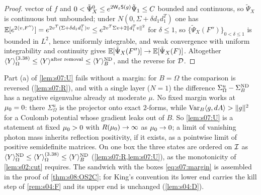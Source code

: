 \begin{proof}
vector of $f$ and $0<\tilde\Psi^0_X\le e^{2\mathsf W_{\varepsilon}\mathsf S(g)}\tilde\Psi_1\le C$ bounded and continuous, so $\tilde\Psi_X$ is continuous but unbounded; under $N(0,\Sigma+\delta d_1d_1^T)$ one has $\mathbb E[e^{2\langle v,F''\rangle}]=e^{2v^T(\Sigma+\delta d_1d_1^T)v}\le e^{2v^T\Sigma v+2\|d_1^Tv\|^2}$ for $\delta\le1$, so $\{\tilde\Psi_X(F'')\}_{0<\delta\le1}$ is bounded in $L^2$, hence uniformly integrable, and weak convergence with uniform integrability and continuity gives $\mathbb E[\tilde\Psi_X(F'')]\to\mathbb E[\tilde\Psi_X(F)]$. Altogether $\langle Y\rangle^{(3.38)}_\Omega\le\langle Y\rangle^{\text{after removal}}\le\langle Y\rangle^{\mathrm{ND}}_B$, and the reverse for $\mathcal D$.
\end{proof}

\begin{remark}
Part (a) of \cref{lem:s07:U} fails without a margin: for $B=\Omega$ the comparison is reversed (\cref{lem:s07:R}), and with a single layer ($N=1$) the difference $\Sigma^u_\Omega-\Sigma^{\mathrm{ND}}_B$ has a negative eigenvalue already at moderate $\mu$. No fixed margin works at $\mu_0=0$: there $\Sigma^u_\Omega$ is the projector onto exact $2$-forms, while $\operatorname{Var}_B\langle g,dA\rangle>\|g\|^2$ for a Coulomb potential whose gradient leaks out of $B$. So \cref{lem:s07:U} is a statement at fixed $\mu_0>0$ with $R(\mu_0)\to\infty$ as $\mu_0\to0$; a limit of vanishing photon mass inherits reflection positivity, if it exists, as a pointwise limit of positive semidefinite matrices. On one box the three states are ordered on $\mathcal I$ as $\langle Y\rangle^{\mathrm{ND}}_\Omega\le\langle Y\rangle^{(3.38)}_\Omega\le\langle Y\rangle^{\mathrm{ND}}_B$ (\cref{lem:s07:R,lem:s07:U}), as the monotonicity of \cref{lem:s02:cut} requires. The sandwich with the boxes \eqref{eq:s07:margin} is assembled in the proof of \cref{thm:s08:OS2C}; for King's convention its lower end carries the kill step of \cref{rem:s04:F} and its upper end is unchanged (\cref{lem:s04:D}).
\end{remark}

